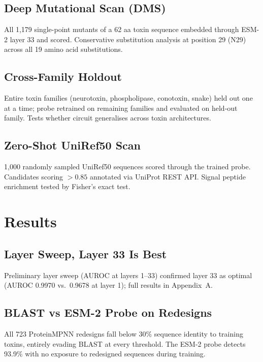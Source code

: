 \documentclass[11pt,a4paper]{article}
\begin{document}
\subsection{Deep Mutational Scan (DMS)}
All 1,179 single-point mutants of a 62 aa toxin sequence embedded through ESM-2 layer 33 and scored. Conservative substitution analysis at position 29 (N29) across all 19 amino acid substitutions.

\subsection{Cross-Family Holdout}
Entire toxin families (neurotoxin, phospholipase, conotoxin, snake) held out one at a time; probe retrained on remaining families and evaluated on held-out family. Tests whether circuit generalises across toxin architectures.

\subsection{Zero-Shot UniRef50 Scan}
1,000 randomly sampled UniRef50 sequences scored through the trained probe. Candidates scoring $> 0.85$ annotated via UniProt REST API. Signal peptide enrichment tested by Fisher's exact test.

\section{Results}

\subsection{Layer Sweep,  Layer 33 Is Best}

Preliminary layer sweep (AUROC at layers 1--33) confirmed layer 33 as optimal (AUROC 0.9970 vs.\ 0.9678 at layer 1); full results in Appendix~A.

\subsection{BLAST vs ESM-2 Probe on Redesigns}

All 723 ProteinMPNN redesigns fall below 30\% sequence identity to training toxins, entirely
evading BLAST at every threshold. The ESM-2 probe detects 93.9\% with no exposure to redesigned sequences during training.
\end{document}
